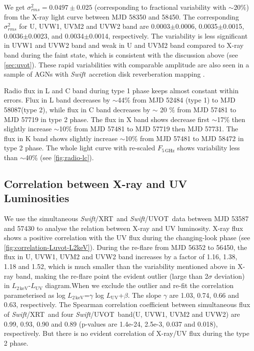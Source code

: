 \documentclass[twocolumn]{aastex63}
\newcommand{\swift}{{\small \it Swift}}
\newcommand{\xrt}{{\small {\it Swift}/XRT}}
\newcommand{\uvot}{{\small {\it Swift}/UVOT}}
\begin{document}
We get $\sigma^2_{rms} = 0.0497 \pm 0.025 $ (corresponding to fractional variability with $\sim$20\%) from the X-ray light curve between MJD 58350 and 58450. The corresponding $\sigma^2_{rms}$ for U, UVW1, UVM2 and UVW2 band are 0.0003$\pm$0.0006, 0.0035$\pm$0.0015, 0.0036$\pm$0.0023, and 0.0034$\pm$0.0014, respectively. The variability is less significant in UVW1 and UVW2 band and weak in U and UVM2 band compared to X-ray band during the faint state, which is consistent with the discussion above (see \autoref{sec:uvot}). These rapid variabilities with comparable amplitude are also seen in a sample of AGNs with \swift \, accretion disk reverberation mapping \citep[see ][]{2019ApJ...870..123E}.

Radio flux in L and C band during type 1 phase keeps almost constant within errors. Flux in L band decreases by $\sim$44\% from MJD 52484 (type 1) to MJD 58087(type 2), while flux in C band decreases by $\sim$ 20 \% from MJD 57481 to MJD 57719 in type 2 phase. The flux in X band shows decrease first $\sim$17\% then slightly increase $\sim$10\% from MJD 57481 to MJD 57719 then MJD 57731. The flux in K band shows slightly increase $\sim$10\% from MJD 57481 to MJD 58472 in type 2 phase. The whole light curve with re-scaled $F_\mathrm{5\,GHz}$ shows variability less than $\sim$40\% (see \autoref{fig:radio-lc}). 



\subsection{Correlation between X-ray and UV Luminosities}\label{subsec:xray-uv}
We use the simultaneous \xrt\, and \uvot\, data between MJD 53587 and 57430 to analyse the relation between X-ray and UV luminosity. X-ray flux shows a positive correlation with the UV flux during the changing-look phase (see \autoref{fig:correlation-Luvot-L2keV}). During the re-flare from MJD 56352 to 56450, the flux in U, UVW1, UVM2 and UVW2 band increases by a factor of 1.16, 1.38, 1.18 and 1.52, which is much smaller than the variability mentioned above in X-ray band, making the re-flare point the evident outlier (large than 2$\sigma$ deviation) in $L_\mathrm{{2\,keV}}$-$L_\mathrm{{UV}}$ diagram.When we exclude the outlier and re-fit the correlation parameterised as log $ L_\mathrm{{2\,keV}}$=$\gamma$ log $ L_\mathrm{{UV}}$+$\beta$. The slope $\gamma$ are 1.03, 0.74, 0.66 and 0.63, respectively. The Spearman correlation coefficient between simultaneous flux of \xrt\, and four \uvot\, band(U, UVW1, UVM2 and UVW2) are 0.99, 0.93, 0.90 and 0.89 (p-values are 1.4e-24, 2.5e-3, 0.037 and 0.018), respectively. But there is no evident correlation of X-ray/UV flux during the type 2 phase.
\end{document}
